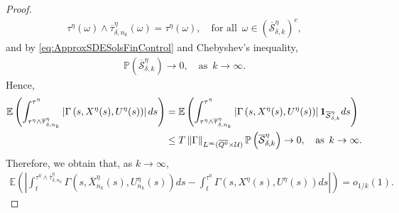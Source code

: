 \documentclass[amscd,amssymb,11pt]{article}
\numberwithin{theorem}{section}
\numberwithin{equation}{section}
\begin{document}
\begin{proof}
\begin{align}
\tau^{\eta}(\omega)\wedge\overline{\tau}_{\delta,n_{k}}^{\eta}(\omega)=\tau^{\eta}(\omega),\quad\text{for all }\,\omega\in\left(\overline{\mathcal{S}}^{\eta}_{\delta,k}\right)^{c},
\end{align}
and by \eqref{eq:ApproxSDESolsFinControl} and Chebyshev's inequality,
\begin{align}\label{eq:ProbOverlineSetadeltak}
\mathbb{P}\left(\overline{\mathcal{S}}^{\eta}_{\delta,k}\right)\rightarrow 0,\quad\text{as }\,k\rightarrow\infty.
\end{align}
Hence,
\begin{align*}
\mathbb{E}\left(\int_{\tau^{\eta}\wedge\overline{\tau}_{\delta,n_{k}}^{\eta}}^{\tau^{\eta}}\left|\Gamma\left(s,X^{\eta}(s),U^{\eta}(s)\right)\right|ds\right)&=\mathbb{E}\left(\int_{\tau^{\eta}\wedge\overline{\tau}_{\delta,n_{k}}^{\eta}}^{\tau^{\eta}}\left|\Gamma\left(s,X^{\eta}(s),U^{\eta}(s)\right)\right|{\bf 1}_{\overline{\mathcal{S}}^{\eta}_{\delta,k}}ds\right)\\
&\leq T\left\|\Gamma\right\|_{L^{\infty}(\overline{Q^{0}}\times\mathcal{U})}\mathbb{P}\left(\overline{\mathcal{S}}^{\eta}_{\delta,k}\right)\rightarrow 0,\quad\text{as }\,k\rightarrow\infty.
\end{align*}
Therefore, we obtain that, as $k\rightarrow\infty$,
\begin{align}\label{eq:EstDiffIntGammaXnketaXeta}
\mathbb{E}\left(\left|\int_{t}^{\tau^{\eta}\wedge\overline{\tau}_{\delta,n_{k}}^{\eta}}\Gamma\left(s,\overline{X}_{n_{k}}^{\eta}(s),U_{n_{k}}^{\eta}(s)\right)ds-\int_{t}^{\tau^{\eta}}\Gamma\left(s,X^{\eta}(s),U^{\eta}(s)\right)ds\right|\right)=o_{1/k}(1).
\end{align}


\end{proof}
\end{document}
